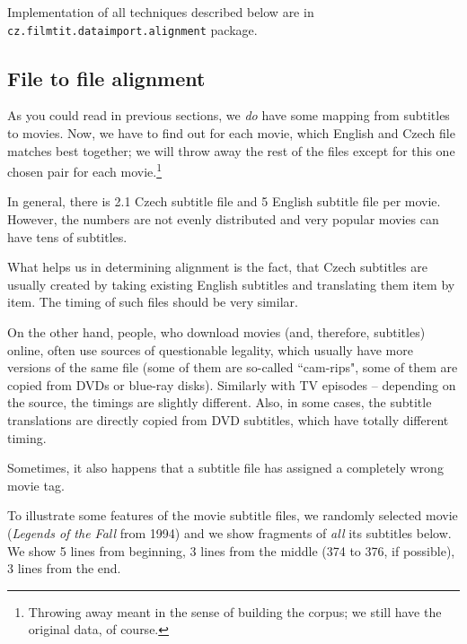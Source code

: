 Implementation of all techniques described below are in \texttt{cz.filmtit.dataimport.alignment} package.

\subsection{File to file alignment}
As you could read in previous sections, we \emph{do} have some mapping from subtitles to movies. Now, we have to find out for each movie, which English and Czech file matches best together; we will throw away the rest of the files except for this one chosen pair for each movie.\footnote{Throwing away meant in the sense of building the corpus; we still have the original data, of course.}

In general, there is 2.1 Czech subtitle file and 5 English subtitle file per movie. However, the numbers are not evenly distributed and very popular movies can have tens of subtitles.

What helps us in determining alignment is the fact, that Czech subtitles are usually created by taking existing English subtitles and translating them item by item. The timing of such files should be very similar. 

On the other hand, people, who download movies (and, therefore, subtitles) online, often use sources of questionable legality, which usually have more versions of the same file (some of them are so-called ``cam-rips", some of them are copied from DVDs or blue-ray disks). Similarly with TV episodes -- depending on the source, the timings are slightly different. Also, in some cases, the subtitle translations are directly copied from DVD subtitles, which have totally different timing.

Sometimes, it also happens that a subtitle file has assigned a completely wrong movie tag.

To illustrate some features of the movie subtitle files, we randomly selected movie (\emph{Legends of the Fall} from 1994) and we show fragments of \emph{all} its subtitles below. We show 5 lines from beginning, 3 lines from the middle (374 to 376, if possible), 3 lines from the end.



\newcommand{\nicesubs}[4]{
\noindent
\begin{boxedminipage}{\textwidth}
\begin{minipage}[b]{0.24\textwidth}\footnotesize\smaller[2]{\tt
#1
}\end{minipage}
\begin{minipage}[b]{0.24\textwidth}\footnotesize\smaller[2]{\tt
#2
}\end{minipage}
\begin{minipage}[b]{0.24\textwidth}\footnotesize\smaller[2]{\tt
#3
}\end{minipage}
\begin{minipage}[b]{0.24\textwidth}\footnotesize\smaller[2]{\tt
#4
}\end{minipage}
\end{boxedminipage}
}


